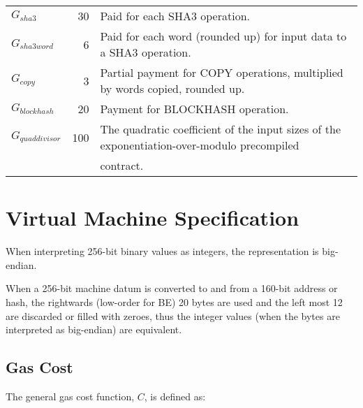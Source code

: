 \documentclass[9pt,oneside]{amsart}
\begin{document}
\begin{tabu}{l r l}
$G_{sha3}$ & 30 & Paid for each {\small SHA3} operation. \\
$G_{sha3word}$ & 6 & Paid for each word (rounded up) for input data to a {\small SHA3} operation. \\
$G_{copy}$ & 3 & Partial payment for {\small *COPY} operations, multiplied by words copied, rounded up. \\
$G_{blockhash}$ & 20 & Payment for {\small BLOCKHASH} operation. \\
$G_{quaddivisor}$ & 100 & The quadratic coefficient of the input sizes of the exponentiation-over-modulo precompiled\\
&&contract. \\

\bottomrule
\end{tabu}

\section{Virtual Machine Specification}\label{app:vm}

When interpreting 256-bit binary values as integers, the representation is big-endian.

When a 256-bit machine datum is converted to and from a 160-bit address or hash, the rightwards (low-order for BE) 20 bytes are used and the left most 12 are discarded or filled with zeroes, thus the integer values (when the bytes are interpreted as big-endian) are equivalent.

\subsection{Gas Cost}

The general gas cost function, $C$, is defined as:
\end{document}
